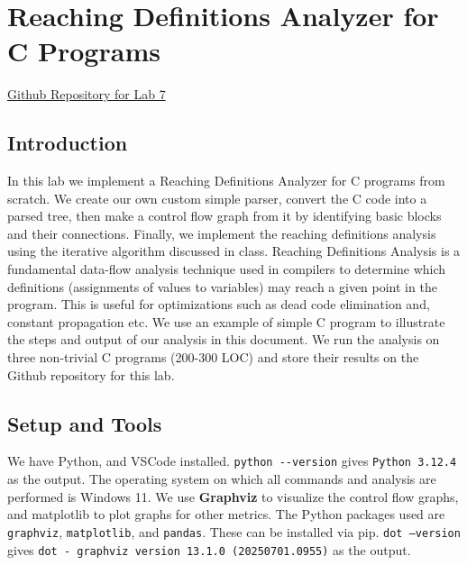 
\chapter[Reaching Definitions Analyzer for C Programs]{Reaching Definitions Analyzer for C Programs}
\label{ch:lab6} %

\begin{center}
    \href{https://github.com/jsmaskeen/CS202-STTCSE/tree/lab7}{Github Repository for Lab 7}
\end{center}

\section{Introduction}
In this lab we implement a Reaching Definitions Analyzer for C programs from
scratch. We create our own custom simple parser, convert the C code into a
parsed tree, then make a control flow graph from it by identifying basic blocks
and their connections. Finally, we implement the reaching definitions analysis
using the iterative algorithm discussed in class. Reaching Definitions Analysis
is a fundamental data-flow analysis technique used in compilers to determine
which definitions (assignments of values to variables) may reach a given point
in the program. This is useful for optimizations such as dead code elimination
and, constant propagation etc. We use an example of simple C program to
illustrate the steps and output of our analysis in this document. We run the analysis on three
non-trivial C programs (200-300 LOC) and store their results on the Github
repository for this lab.

\section{Setup and Tools}
We have Python, and VSCode installed. \texttt{python {-}{-}version} gives
\texttt{Python 3.12.4} as the output. The operating system on which all
commands and analysis are performed is Windows 11. We use \textbf{Graphviz} to
visualize the control flow graphs, and matplotlib to plot graphs for other
metrics. The Python packages used are \texttt{graphviz}, \texttt{matplotlib},
and \texttt{pandas}. These can be installed via pip. \texttt{dot --version}
gives \texttt{dot - graphviz version 13.1.0 (20250701.0955)} as the output.

